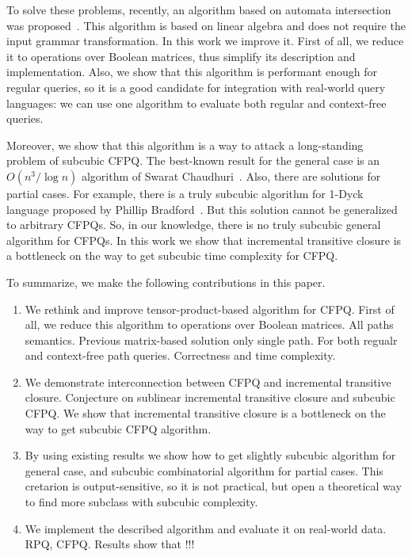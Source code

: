 To solve these problems, recently, an algorithm based on automata intersection was proposed~\cite{10.1007/978-3-030-54832-2_6}.
This algorithm is based on linear algebra and does not require the input grammar transformation.
In this work we improve it.
First of all, we reduce it to operations over Boolean matrices, thus simplify its description and implementation.
Also, we show that this algorithm is performant enough for regular queries, so it is a good candidate for integration with real-world query languages: we can use one algorithm to evaluate both regular and context-free queries. 

Moreover, we show that this algorithm is a way to attack a long-standing problem of subcubic CFPQ. 
The best-known result for the general case is an $O(n^3/\log{n})$ algorithm of Swarat Chaudhuri~\cite{10.1145/1328438.1328460}. 
Also, there are solutions for partial cases. 
For example, there is a truly subcubic algorithm for 1-Dyck language proposed by Phillip Bradford~\cite{8249039}.
But this solution cannot be generalized to arbitrary CFPQs. 
So, in our knowledge, there is no truly subcubic general algorithm for CFPQs. 
In this work we show that incremental transitive closure is a bottleneck on the way to get subcubic time complexity for CFPQ.

To summarize, we make the following contributions in this paper.
\begin{enumerate}
	\item We rethink and improve tensor-product-based algorithm for CFPQ. First of all, we reduce this algorithm to operations over Boolean matrices. All paths semantics. Previous matrix-based solution only single path. For both regualr and context-free path queries. Correctness and time complexity.
	\item We demonstrate interconnection between CFPQ and incremental transitive closure. Conjecture on sublinear incremental transitive closure and subcubic CFPQ. We show that incremental transitive closure is a bottleneck on the way to get subcubic CFPQ algorithm.
	\item By using existing results we show how to get slightly subcubic algorithm for general case, and subcubic combinatorial algorithm for partial cases. This cretarion is output-sensitive, so it is not practical, but open a theoretical way to find more subclass with subcubic complexity.
	\item We implement the described algorithm and evaluate it on real-world data. RPQ, CFPQ. Results show that !!!
\end{enumerate}